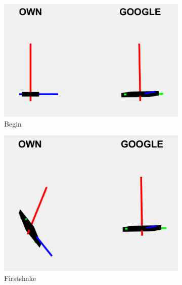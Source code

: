 \begin{figure}[H]
    \centering
    \begin{subfigure}[H]{0.3\textwidth}
        \includegraphics[width=\textwidth]{images/beginning.png}
        \caption{Begin}
        \label{fig:begin}
    \end{subfigure}
    \hfill
    \begin{subfigure}[H]{0.3\textwidth}
        \includegraphics[width=\textwidth]{images/drift1.png}
        \caption{Firstshake}
        \label{fig:drift1}
    \end{subfigure}
    \hfill
    \begin{subfigure}[H]{0.3\textwidth}

\end{subfigure}
\end{figure}
